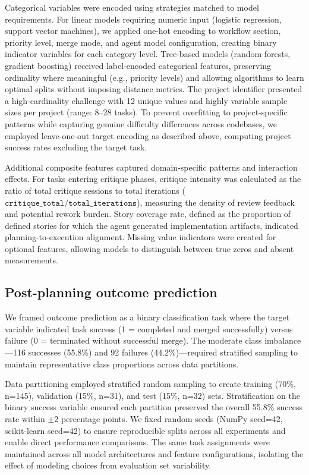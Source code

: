 \documentclass[]{article}
\begin{document}
Categorical variables were encoded using strategies matched to model requirements. For linear models requiring numeric input (logistic regression, support vector machines), we applied one-hot encoding to workflow section, priority level, merge mode, and agent model configuration, creating binary indicator variables for each category level. Tree-based models (random forests, gradient boosting) received label-encoded categorical features, preserving ordinality where meaningful (e.g., priority levels) and allowing algorithms to learn optimal splits without imposing distance metrics. The project identifier presented a high-cardinality challenge with 12 unique values and highly variable sample sizes per project (range: 8--28 tasks). To prevent overfitting to project-specific patterns while capturing genuine difficulty differences across codebases, we employed leave-one-out target encoding as described above, computing project success rates excluding the target task.

Additional composite features captured domain-specific patterns and interaction effects. For tasks entering critique phases, critique intensity was calculated as the ratio of total critique sessions to total iterations ($\texttt{critique\_total} / \texttt{total\_iterations}$), measuring the density of review feedback and potential rework burden. Story coverage rate, defined as the proportion of defined stories for which the agent generated implementation artifacts, indicated planning-to-execution alignment. Missing value indicators were created for optional features, allowing models to distinguish between true zeros and absent measurements.

\subsection{Post-planning outcome prediction}

We framed outcome prediction as a binary classification task where the target variable indicated task success (1 = completed and merged successfully) versus failure (0 = terminated without successful merge). The moderate class imbalance—116 successes (55.8\%) and 92 failures (44.2\%)—required stratified sampling to maintain representative class proportions across data partitions.

Data partitioning employed stratified random sampling to create training (70\%, n=145), validation (15\%, n=31), and test (15\%, n=32) sets. Stratification on the binary success variable ensured each partition preserved the overall 55.8\% success rate within $\pm$2 percentage points. We fixed random seeds (NumPy seed=42, scikit-learn seed=42) to ensure reproducible splits across all experiments and enable direct performance comparisons. The same task assignments were maintained across all model architectures and feature configurations, isolating the effect of modeling choices from evaluation set variability.
\end{document}
